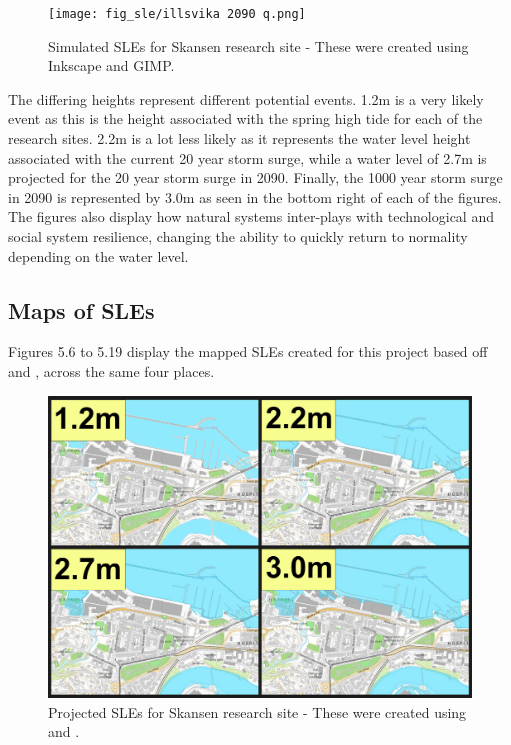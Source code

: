 \begin{figure}[H]
    \centering
    \texttt{[image: fig\_sle/illsvika 2090 q.png]}
    \caption{Simulated SLEs for Skansen research site - These were created using Inkscape and GIMP. }
    \label{fig:sle_skansen}
\end{figure}


The differing heights represent different potential events. 1.2m is a very likely event as this is the height associated with the spring high tide for each of the research sites. 2.2m is a lot less likely as it represents the water level height associated with the current 20 year storm surge, while a water level of 2.7m is projected for the 20 year storm surge in 2090. Finally, the 1000 year storm surge in 2090 is represented by 3.0m as seen in the bottom right of each of the figures. The figures also display how natural systems inter-plays with technological and social system resilience, changing the ability to quickly return to normality depending on the water level. 

\subsection{Maps of SLEs}
Figures 5.6 to 5.19 display the mapped SLEs created for this project based off \cite{kartverket_se_2020} and \cite{stormflo_database_stormflo_2021}, across the same four places.

\begin{figure}[H]
    \centering
    \includegraphics[width=16cm]{fig_sle/skansen-sle-num.png}
    \caption{Projected SLEs for Skansen research site - These were created using \cite{kartverket_se_2021} and \cite{stormflo_database_stormflo_2021}. }
    \label{fig:sle_skansen_num}
\end{figure}

